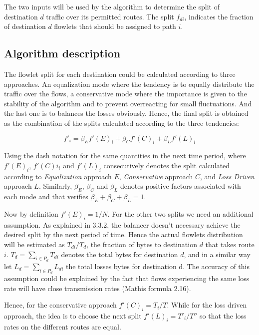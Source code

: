 The two inputs will be used by the algorithm to determine the split of destination $d$ traffic over its permitted routes. The split $f_{di}$, indicates  the fraction of destination $d$ flowlets  that should be assigned to path $i$. 

\subsection{Algorithm description}

The flowlet split for each destination could be calculated according to three approaches. An equalization mode where the tendency is to equally distribute the traffic over the flows, a conservative mode where the importance is given to the stability of the algorithm and to prevent overreacting for small fluctuations. And the last one is to balances the losses obviously.
Hence, the final split is obtained as the combination of the splits calculated according to the three tendencies:

\begin{equation}
f'_{i} = \beta_{E}f'(E)_{i} + \beta_{C}f'(C)_{i} + \beta_{L}f'(L)_{i}
\end{equation}

Using the dash notation for the same quantities in the next time period, where $f'(E)_{i}$, $f'(C)i_{i}$ and $f'(L)_{i}$ consecutively denotes the split calculated according to {\it Equalization} approach $E$, {\it Conservative} approach $C$, and {\it Loss Driven } approach $L$. Similarly, $\beta_{E}$, $\beta_{C}$ and $\beta_{L}$ denotes positive factors associated with each mode and that verifies $\beta_{E}+\beta_{C}+\beta_{L} = 1$. 

Now by definition $f'(E)_{i} = 1/N$. For the other two splits we need an additional assumption. As explained in 3.3.2,  the balancer doesn't necessary achieve the desired split by the next period of time. Hence the actual flowlets distribution will be estimated as $T_{di}/ T_{d}$, the fraction of bytes to destination $d$ that takes route $i$. $T_{d} = \sum_{i \in P_{d}}T_{di}$ denotes the total bytes for destination $d$,  and in a similar way let $L_{d} = \sum_{i \in P_{d}}L_{di}$ the total losses bytes for destination d. The accuracy of this assumption could be explained by the fact that flows experiencing the same loss rate will have close transmission rates (Mathis formula 2.16).

Hence, for the conservative approach $f'(C)_{i} = T_{i}/T$. While for the loss driven approach, the idea is to choose the next split  $f'(L)_{i} = T'_{i}/T''$ so that the loss rates on the different routes are equal.

